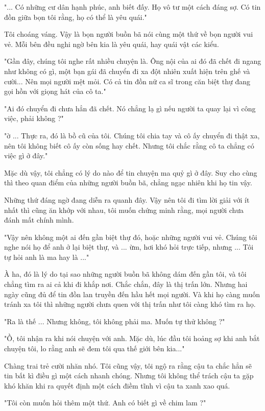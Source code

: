 "... Có những cư dân hạnh phúc, anh biết đấy. Họ vô tư một cách đáng sợ. Có tin đồn giữa bọn tôi rằng, họ có thể là yêu quái."

Tôi choáng váng. Vậy là bọn người buồn bã nói cùng một thứ về bọn người vui vẻ. Mỗi bên đều nghi ngờ bên kia là yêu quái, hay quái vật các kiểu.

"Gần đây, chúng tôi nghe rất nhiều chuyện là. Ông nội của ai đó đã chết đi ngang như không có gì, một bạn gái đã chuyển đi xa đột nhiên xuất hiện trên ghế và cười... Nên mọi người mệt mỏi. Có cả tin đồn nữ ca sĩ trong căn biệt thự đang gọi hồn với giọng hát của cô ta."

"Ai đó chuyển đi chưa hẳn đã chết. Nó chẳng lạ gì nếu người ta quay lại vì công việc, phải không ?"

"ờ ... Thực ra, đó là bồ cũ của tôi. Chúng tôi chia tay và cô ấy chuyển đi thật xa, nên tôi không biết cô ấy còn sống hay chết. Nhưng tôi chắc rằng cô ta chẳng có việc gì ở đây."

Mặc dù vậy, tôi chẳng có lý do nào để tin chuyện ma quỷ gì ở đây. Suy cho cùng thì theo quan điểm của những người buồn bã, chẳng ngạc nhiên khi họ tin vậy.

Những thứ đáng ngờ đang diễn ra quanh đây. Vậy nên tôi đi tìm lời giải với ít nhất thì cũng ăn khớp với nhau, tôi muốn chứng minh rằng, mọi người chưa đánh mất chính mình.

"Vậy nên không một ai đến gần biệt thự đó, hoặc những người vui vẻ. Chúng tôi nghe nói họ để anh ở lại biệt thự, và ... ừm, hơi khó hỏi trực tiếp, nhưng ... Tôi tự hỏi anh là ma hay là ..."

À ha, đó là lý do tại sao những người buồn bã không dám đến gần tôi, và tôi chẳng tìm ra ai cả khi đi khắp nơi. Chắc chắn, đây là thị trấn lớn. Nhưng hai ngày cũng đủ để tin đồn lan truyền đến hầu hết mọi người. Và khi họ càng muốn tránh xa tôi thì những người chưa quen với thị trấn như tôi càng khó tìm ra họ.

"Ra là thế ... Nhưng không, tôi không phải ma. Muốn tự thử không ?"

"Ồ, tôi nhận ra khi nói chuyện với anh. Mặc dù, lúc đầu tôi hoảng sợ khi anh bắt chuyện tôi, lo rằng anh sẽ đem tôi qua thế giới bên kia..."

Chàng trai trẻ cười nhăn nhó. Tôi cũng vậy, tôi ngộ ra rằng cậu ta chắc hẳn sẽ tin bất kì điều gì một cách nhanh chóng. Nhưng tôi không thể trách cậu ta gặp khó khăn khi ra quyết định một cách điềm tĩnh vì cậu ta xanh xao quá.

"Tôi còn muốn hỏi thêm một thứ. Anh có biết gì về chim lam ?"

